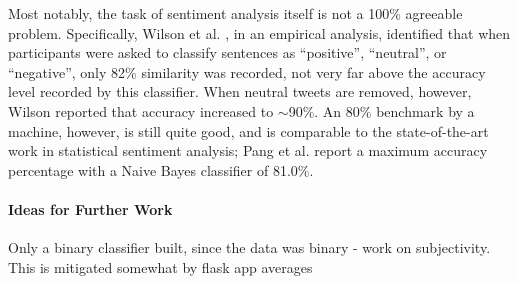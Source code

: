 \documentclass[letter,12pt]{article}
\begin{document}
Most notably, the task of sentiment analysis itself is
not a 100\% agreeable problem.  Specifically, Wilson et al. \cite{wilson05}, in
an empirical analysis, identified that when participants were asked to classify
sentences as ``positive'', ``neutral'', or ``negative'', only 82\% similarity
was recorded, not very far above the accuracy level recorded by this
classifier. When neutral tweets are removed, however, Wilson reported that
accuracy increased to $\sim$90\%. An $80\%$ benchmark by a machine, however, is
still quite good, and is comparable to the state-of-the-art work in statistical
sentiment analysis; Pang et al. \cite{pang02} report a maximum accuracy
percentage with a Naive Bayes classifier of 81.0\%.

\paragraph{Ideas for Further Work}

Only a binary classifier built, since the data was binary - work on
subjectivity. This is mitigated somewhat by flask app averages
\end{document}
